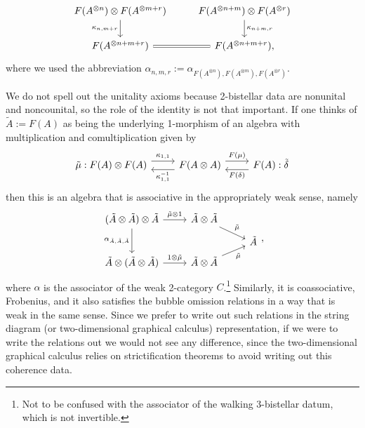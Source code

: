 \documentclass[12pt,a4paper]{article}
\numberwithin{equation}{section}
\begin{document}
\begin{example}
\begin{enumerate}
\begin{equation}
\begin{tikzcd}
                F(A^{\otimes n}) \otimes F(A^{\otimes m + r}) \arrow[d, "{\kappa_{n, m + r}}"'] & F(A^{\otimes n + m}) \otimes F(A^{\otimes r}) \arrow[d, "{\kappa_{n + m, r}}"] \\
                F(A^{\otimes n + m + r}) \arrow[r, Rightarrow, no head] & F(A^{\otimes n + m + r}),
            \end{tikzcd}
        \end{equation}
        where we used the abbreviation $\alpha_{n,m,r} := \alpha_{F(A^{\otimes n}), F(A^{\otimes m}), F(A^{\otimes r})}$.
    \end{enumerate}
    We do not spell out the unitality axioms because 2-bistellar data are nonunital and noncounital, so the role of the identity is not that important. If one thinks of $\tilde{A} := F(A)$ as being the underlying 1-morphism of an algebra with multiplication and comultiplication given by
    \begin{equation}
        \begin{tikzcd}
            \tilde{\mu}: F(A) \otimes F(A) \arrow[r, shift left = 1ex, "\kappa_{1,1}"] & F(A \otimes A) \arrow[l, shift left = 1ex, "\kappa_{1,1}^{-1}"] \arrow[r, shift left = 1ex, "F(\mu)"] & F(A) \arrow[l, shift left = 1ex, "F(\delta)"]: \tilde{\delta}
        \end{tikzcd}
    \end{equation}
    then this is an algebra that is associative in the appropriately weak sense, namely
    \begin{equation}
        \begin{tikzcd}[row sep = tiny]
            (\tilde{A} \otimes \tilde{A}) \otimes \tilde{A} \arrow[r, "\tilde{\mu} \otimes 1"] \arrow[dd, "\alpha_{\tilde{A},\tilde{A},\tilde{A}}"'] & \tilde{A} \otimes \tilde{A} \arrow[rd, "\tilde{\mu}"] \\
            & & \tilde{A} \\
            \tilde{A} \otimes (\tilde{A} \otimes \tilde{A}) \arrow[r, "1 \otimes \tilde{\mu}"] & \tilde{A} \otimes \tilde{A} \arrow[ru, "\tilde{\mu}"']
        \end{tikzcd},
    \end{equation}
    where $\alpha$ is the associator of the weak 2-category $C$.\footnote{Not to be confused with the associator of the walking 3-bistellar datum, which is not invertible.} Similarly, it is coassociative, Frobenius, and it also satisfies the bubble omission relations in a way that is weak in the same sense. Since we prefer to write out such relations in the string diagram (or two-dimensional graphical calculus) representation, if we were to write the relations out we would not see any difference, since the two-dimensional graphical calculus relies on strictification theorems to avoid writing out this coherence data.
\end{example}
\end{document}
